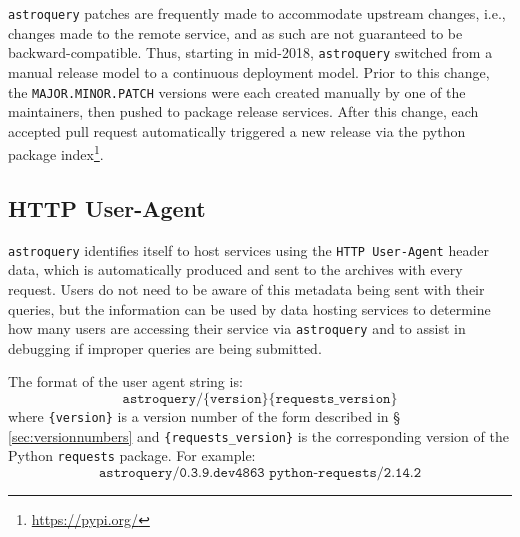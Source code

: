 \documentclass[twocolumn]{aastex62}
\newcommand{\package}[1]{\texttt{#1}\xspace}
\newcommand{\astroquery}{\package{astroquery}}
\newcommand{\astropypkg}{\package{astropy}}
\begin{document}
\astroquery patches are frequently made to accommodate upstream changes, i.e.,
changes made to the remote service, and as such are not guaranteed to be
backward-compatible. Thus, starting in mid-2018, \astroquery switched from a manual release model to a
continuous deployment model.  Prior to this change, the
\texttt{MAJOR.MINOR.PATCH} versions were each created manually by one of the
maintainers, then pushed to package release services.  After this change, each
accepted pull request automatically triggered a new release via the python
package index\footnote{\url{https://pypi.org/}}.


%

\subsection{HTTP User-Agent}
\label{sec:useragent}
\astroquery identifies itself to host services using the \texttt{HTTP
User-Agent} header data, which is automatically produced and sent to the
archives with every request.
Users do not need to be aware of this metadata being sent with their
queries, but the information can be used by data hosting services to determine
how many users are accessing their service via \astroquery and to assist in
debugging if improper queries are being submitted.

The format of the user agent string is:
\[\texttt{astroquery/\{version\} \{requests\_version\}}\] where
\texttt{\{version\}} is a version number of the form described in \S
\ref{sec:versionnumbers} and \texttt{\{requests\_version\}} is the
corresponding version of the Python \package{requests} package. For example:
\[\texttt{astroquery/0.3.9.dev4863 python-requests/2.14.2}\]
\end{document}
